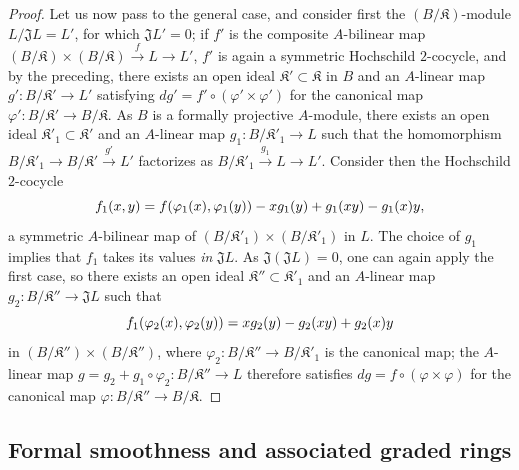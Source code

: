 \begin{proof}
Let us now pass to the general case, and consider first the $(B/\mathfrak K)$-module $L/\mathfrak{J}L=L'$, for which $\mathfrak{J}L'=0$;
if $f'$ is the composite $A$-bilinear map $(B/\mathfrak K)\times(B/\mathfrak K)\xrightarrow{f}L\to L'$, $f'$ is again a symmetric Hochschild $2$-cocycle, and by the preceding, there exists an open ideal $\mathfrak K'\subset\mathfrak K$ in $B$ and an $A$-linear map $g':B/\mathfrak K'\to L'$ satisfying $dg'=f'\circ(\varphi'\times\varphi')$ for the canonical map $\varphi':B/\mathfrak K'\to B/\mathfrak K$.
As $B$ is a formally projective $A$-module, there exists an open ideal $\mathfrak K'_1\subset\mathfrak K'$ and an $A$-linear map $g_1:B/\mathfrak K'_1\to L$ such that the homomorphism $B/\mathfrak K'_1\to B/\mathfrak K'\xrightarrow{g'}L'$ factorizes as $B/\mathfrak K'_1\xrightarrow{g_1}L\to L'$.
Consider then the Hochschild $2$-cocycle
\[
  f_1(x,y) = f(\varphi_1(x),\varphi_1(y)) - xg_1(y) + g_1(xy) - g_1(x)y,
\]
a symmetric $A$-bilinear map of $(B/\mathfrak K'_1)\times(B/\mathfrak K'_1)$ in $L$.
The choice of $g_1$ implies that $f_1$ takes its values \emph{in} $\mathfrak{J}L$.
As $\mathfrak{J}(\mathfrak{J}L)=0$, one can again apply the first case, so there exists an open ideal $\mathfrak K''\subset\mathfrak K'_1$ and an $A$-linear map $g_2:B/\mathfrak K''\to\mathfrak{J}L$ such that
\[
  f_1(\varphi_2(x),\varphi_2(y)) = xg_2(y) - g_2(xy) + g_2(x)y
\]
in $(B/\mathfrak K'')\times(B/\mathfrak K'')$, where $\varphi_2:B/\mathfrak K''\to B/\mathfrak K'_1$ is the canonical map;
the $A$-linear map $g=g_2+g_1\circ\varphi_2:B/\mathfrak K''\to L$ therefore satisfies $dg=f\circ(\varphi\times\varphi)$ for the canonical map $\varphi:B/\mathfrak K''\to B/\mathfrak K$.
\end{proof}

\subsection{Formal smoothness and associated graded rings}
\label{subsection:0.19.5}


